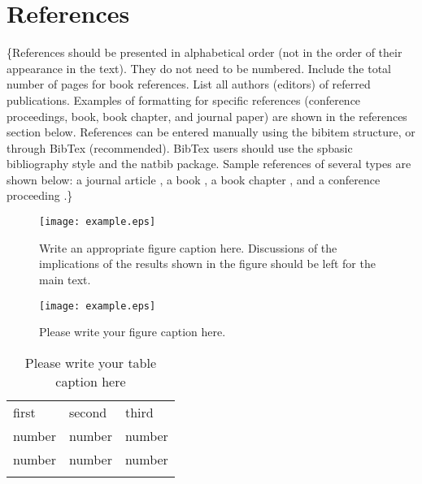 \section{References}
\{References should be presented in alphabetical order (not in the order of their appearance in the text). They do not need to be numbered. Include the total number of pages for book references. List all authors (editors) of referred publications. Examples of formatting for specific references (conference proceedings, book, book chapter, and journal paper) are shown in the references section below. References can be entered manually using the bibitem structure, or through BibTex (recommended). BibTex users should use the spbasic bibliography style and the natbib package. Sample references of several types are shown below: a journal article \citep{Mason+1987, Garratt1994}, a book \citep{Garratt1994}, a book chapter \citep{Wyngaard2004}, and a conference proceeding \citep{Batchvarova+2003}.\}


\begin{figure}
\centering
  \texttt{[image: example.eps]}
\caption{Write an appropriate figure caption here. Discussions of the implications of the results shown in the figure should be left for the main text.}
\label{fig1}       %
\end{figure}
%
\begin{figure*}
\centering
\texttt{[image: example.eps]}
\caption{Please write your figure caption here.}
\label{fig2}       %
\end{figure*}
%
\begin{table}
\caption{Please write your table caption here}
\label{tab:1}       %
\begin{tabular}{lll}
\hline\noalign{\smallskip}
first & second & third  \\
\noalign{\smallskip}\hline\noalign{\smallskip}
number & number & number \\
number & number & number \\
\noalign{\smallskip}\hline
\end{tabular}
\end{table}

